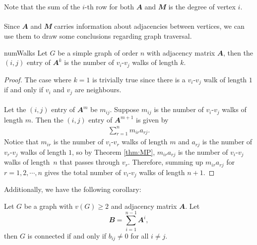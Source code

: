 \documentclass[math]{amznotes}
\theoremstyle{remark}
\begin{document}
\\\\
Note that the sum of the $i$-th row for both $\mathbfit{A}$ and $\mathbfit{M}$ is the degree of vertex $i$. 
\\\\
Since $\mathbfit{A}$ and $\mathbfit{M}$ carries information about adjacencies between vertices, we can use them to draw some conclusions regarding graph traversal.
\begin{probox}{}{numWalks}
    Let $G$ be a simple graph of order $n$ with adjacency matrix $\mathbfit{A}$, then the $(i, j)$ entry of $\mathbfit{A}^k$ is the number of $v_i$-$v_j$ walks of length $k$.
    \tcblower   
    \begin{proof}
        The case where $k = 1$ is trivially true since there is a $v_i$-$v_j$ walk of length $1$ if and only if $v_i$ and $v_j$ are neighbours.
        \\\\
        Let the $(i, j)$ entry of $\mathbfit{A}^m$ be $m_{ij}$. Suppose $m_{ij}$ is the number of $v_i$-$v_j$ walks of length $m$. Then the $(i, j)$ entry of $\mathbfit{A}^{m + 1}$ is given by
        \begin{align*}
            \sum_{r = 1}^{n}m_{ir}a_{rj}.
        \end{align*}
        Notice that $m_{ir}$ is the number of $v_i$-$v_r$ walks of length $m$ and $a_{rj}$ is the number of $v_r$-$v_j$ walks of length $1$, so by Theorem \ref{thm:MP}, $m_{ir}a_{rj}$ is the number of $v_i$-$v_j$ walks of length~$n$ that passes through $v_r$. Therefore, summing up $m_{ir}a_{rj}$ for $r = 1, 2, \cdots, n$ gives the total number of $v_i$-$v_j$ walks of length $n + 1$.
    \end{proof}
\end{probox}
Additionally, we have the following corollary:
\begin{corbox}{}{}
    Let $G$ be a graph with $v(G) \geq 2$ and adjacency matrix $\mathbfit{A}$. Let
    \begin{equation*}
        \mathbfit{B} = \sum_{i = 1}^{n - 1}\mathbfit{A}^i,
    \end{equation*}
    then $G$ is connected if and only if $b_{ij} \neq 0$ for all $i \neq j$.
\end{corbox}
\end{document}
